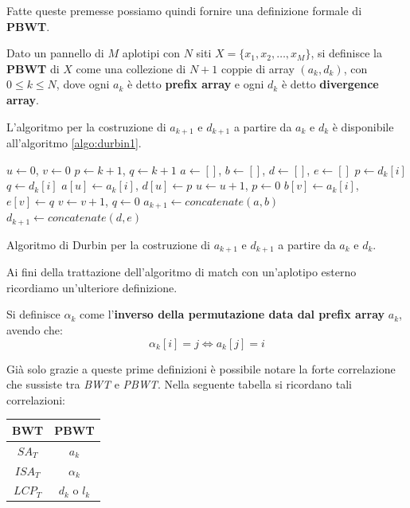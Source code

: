 Fatte queste premesse possiamo quindi fornire una definizione formale di
\textbf{PBWT}.
\begin{definizione}
  Dato un pannello di $M$ aplotipi con $N$
  siti $X=\{x_1,x_2,\ldots,x_M\}$, si definisce la \textbf{PBWT} di $X$ come una
  collezione di $N+1$ coppie di array $(a_k,d_k)$, con $0\leq k\leq N$, dove
  ogni $a_k$ è detto \textbf{prefix array} e ogni $d_k$ è detto
  \textbf{divergence array}.  
\end{definizione}
L'algoritmo per la costruzione di $a_{k+1}$ e $d_{k+1}$ a partire da $a_k$ e
$d_k$ è disponibile all'algoritmo \ref{algo:durbin1}.
\begin{algorithm}
  \small
  \begin{algorithmic}[1]
    \State $u\gets 0$, $v\gets 0$
    \State $p\gets k+1$, $q\gets k+1$
    \State $a\gets []$, $b\gets []$, $d\gets []$, $e\gets []$
    \State $p\gets d_k[i]$
    \EndIf
    \State $q\gets d_k[i]$
    \EndIf
    \State $a[u]\gets a_k[i]$, $d[u]\gets p$
    \State $u\gets u+1$, $p\gets 0$
    \Else
    \State $b[v]\gets a_k[i]$, $e[v]\gets q$
    \State $v\gets v+1$, $q\gets 0$
    \EndIf
    \EndFor
    \State $a_{k+1}\gets concatenate(a,b)$
    \State $d_{k+1}\gets concatenate(d,e)$ 
    \EndFunction
  \end{algorithmic}
  \caption{Algoritmo di Durbin per la costruzione di $a_{k+1}$ e $d_{k+1}$ a
  partire da $a_{k}$ e $d_{k}$.}
  \label{algo:durbin1}
\end{algorithm}
Ai fini della trattazione dell'algoritmo di match con un'aplotipo esterno
ricordiamo un'ulteriore definizione.
\begin{definizione}
  Si definisce $\alpha_k$ come l'\textbf{inverso della permutazione data dal
    prefix array} $a_k$, avendo che:
  \[\alpha_k[i]=j \iff a_k[j]=i\]
\end{definizione}
Già solo grazie a queste prime definizioni è possibile notare la forte
correlazione che sussiste tra \textit{BWT} e \textit{PBWT}. Nella seguente
tabella si ricordano tali correlazioni:
\begin{table}[H]
  \centering
  \begin{tabular}{c|c}
    \textbf{BWT} & \textbf{PBWT}\\
    \hline
    $SA_T$ & $a_k$\\
    $ISA_T$ & $\alpha_k$\\
    $LCP_T$ & $d_k$ o $l_k$\\            
  \end{tabular}
\end{table}
